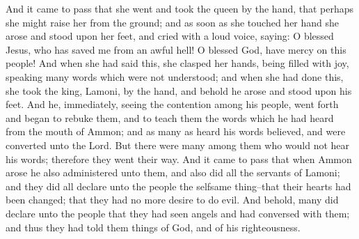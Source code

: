 And it came to pass that she went and took the queen by the hand, that perhaps she might raise her from the ground; and as soon as she touched her hand she arose and stood upon her feet, and cried with a loud voice, saying: O blessed Jesus, who has saved me from an awful hell! O blessed God, have mercy on this people!
\bverse \iffalse And when she had said this, she clasped her hands, being filled with joy, speaking many words which were not understood; and when she had done this, she took the king, Lamoni, by the hand, and behold he arose and stood upon his feet. \fi
And when she had said this, she clasped her hands, being filled with joy, speaking many words which were not understood; and when she had done this, she took the king, Lamoni, by the hand, and behold he arose and stood upon his feet.
\bverse \iffalse And he, immediately, seeing the contention among his people, went forth and began to rebuke them, and to teach them the words which he had heard from the mouth of Ammon; and as many as heard his words believed, and were converted unto the Lord. \fi
And he, immediately, seeing the contention among his people, went forth and began to rebuke them, and to teach them the words which he had heard from the mouth of Ammon; and as many as heard his words believed, and were converted unto the Lord.
\bverse \iffalse But there were many among them who would not hear his words; therefore they went their way. \fi
But there were many among them who would not hear his words; therefore they went their way.
\bverse \iffalse And it came to pass that when Ammon arose he also administered unto them, and also did all the servants of Lamoni; and they did all declare unto the people the selfsame thing--that their hearts had been changed; that they had no more desire to do evil. \fi
And it came to pass that when Ammon arose he also administered unto them, and also did all the servants of Lamoni; and they did all declare unto the people the selfsame thing--that their hearts had been changed; that they had no more desire to do evil.
\bverse \iffalse And behold, many did declare unto the people that they had seen angels and had conversed with them; and thus they had told them things of God, and of his righteousness. \fi
And behold, many did declare unto the people that they had seen angels and had conversed with them; and thus they had told them things of God, and of his righteousness.
\bverse \iffalse And it came to pass that there were many that did believe in their words; and as many as did believe were baptized; and they became a righteous people, and they did establish a church among them. \fi
